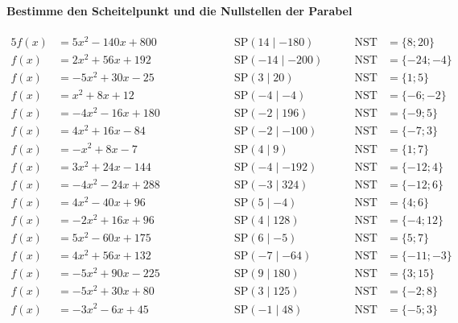 \documentclass
[
  draft    = true,
  fontsize = 11pt,
  parskip  = half-,
  BCOR     = 0pt,
  DIV      = 11
]
{scrartcl}
\begin{document}
\paragraph{Bestimme den Scheitelpunkt und die Nullstellen der Parabel}
\begin{alignat*}{5}
  f(x)&=5x^{2}-140x+800 \qquad&\qquad \quad&\text{SP}(14\mid-180) \quad&\quad \text{NST}&=\{8;20\} \\[0.5ex]
  f(x)&=2x^{2}+56x+192 \qquad&\qquad \quad&\text{SP}(-14\mid-200) \quad&\quad \text{NST}&=\{-24;-4\} \\[0.5ex]
  f(x)&=-5x^{2}+30x-25 \qquad&\qquad \quad&\text{SP}(3\mid20) \quad&\quad \text{NST}&=\{1;5\} \\[0.5ex]
  f(x)&=x^{2}+8x+12 \qquad&\qquad \quad&\text{SP}(-4\mid-4) \quad&\quad \text{NST}&=\{-6;-2\} \\[0.5ex]
  f(x)&=-4x^{2}-16x+180 \qquad&\qquad \quad&\text{SP}(-2\mid196) \quad&\quad \text{NST}&=\{-9;5\} \\[0.5ex]
  f(x)&=4x^{2}+16x-84 \qquad&\qquad \quad&\text{SP}(-2\mid-100) \quad&\quad \text{NST}&=\{-7;3\} \\[0.5ex]
  f(x)&=-x^{2}+8x-7 \qquad&\qquad \quad&\text{SP}(4\mid9) \quad&\quad \text{NST}&=\{1;7\} \\[0.5ex]
  f(x)&=3x^{2}+24x-144 \qquad&\qquad \quad&\text{SP}(-4\mid-192) \quad&\quad \text{NST}&=\{-12;4\} \\[0.5ex]
  f(x)&=-4x^{2}-24x+288 \qquad&\qquad \quad&\text{SP}(-3\mid324) \quad&\quad \text{NST}&=\{-12;6\} \\[0.5ex]
  f(x)&=4x^{2}-40x+96 \qquad&\qquad \quad&\text{SP}(5\mid-4) \quad&\quad \text{NST}&=\{4;6\} \\[0.5ex]
  f(x)&=-2x^{2}+16x+96 \qquad&\qquad \quad&\text{SP}(4\mid128) \quad&\quad \text{NST}&=\{-4;12\} \\[0.5ex]
  f(x)&=5x^{2}-60x+175 \qquad&\qquad \quad&\text{SP}(6\mid-5) \quad&\quad \text{NST}&=\{5;7\} \\[0.5ex]
  f(x)&=4x^{2}+56x+132 \qquad&\qquad \quad&\text{SP}(-7\mid-64) \quad&\quad \text{NST}&=\{-11;-3\} \\[0.5ex]
  f(x)&=-5x^{2}+90x-225 \qquad&\qquad \quad&\text{SP}(9\mid180) \quad&\quad \text{NST}&=\{3;15\} \\[0.5ex]
  f(x)&=-5x^{2}+30x+80 \qquad&\qquad \quad&\text{SP}(3\mid125) \quad&\quad \text{NST}&=\{-2;8\} \\[0.5ex]
  f(x)&=-3x^{2}-6x+45 \qquad&\qquad \quad&\text{SP}(-1\mid48) \quad&\quad \text{NST}&=\{-5;3\} \\[0.5ex]

\end{alignat*}
\end{document}
